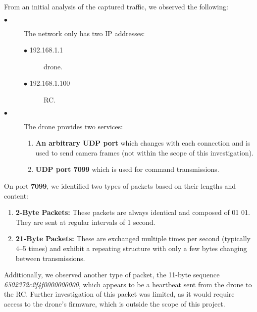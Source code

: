 From an initial analysis of the captured traffic, we observed the following:
\begin{description}
  \item[$\bullet$] The network only has two IP addresses:
  \begin{description}
    \item[$\bullet$ 192.168.1.1]  drone.
    \item[$\bullet$ 192.168.1.100]  RC.
  \end{description}
  \item[$\bullet$] The drone provides two services:
  \begin{enumerate}
    \item \textbf{An arbitrary UDP port} which changes with each connection and is used to send camera frames (not within the scope of this investigation).
    \item \textbf{UDP port 7099} which is used for command transmissions.
  \end{enumerate}
\end{description}
On port \textbf{7099}, we identified two types of packets based on their lengths and content:%
\begin{enumerate}
  \item \textbf{2-Byte Packets:} These packets are always identical and composed of 01 01. They are sent at regular intervals of 1 second.
  \item \textbf{21-Byte Packets:} These are exchanged multiple times per second (typically 4–5 times) and exhibit a repeating structure with only a few bytes changing between transmissions.
\end{enumerate}
Additionally, we observed another type of packet, the 11-byte sequence \textit{6502372c2f4f0000000000}, which appears to be a heartbeat sent from the drone to the RC. Further investigation of this packet was limited, as it would require access to the drone's firmware, which is outside the scope of this project.

